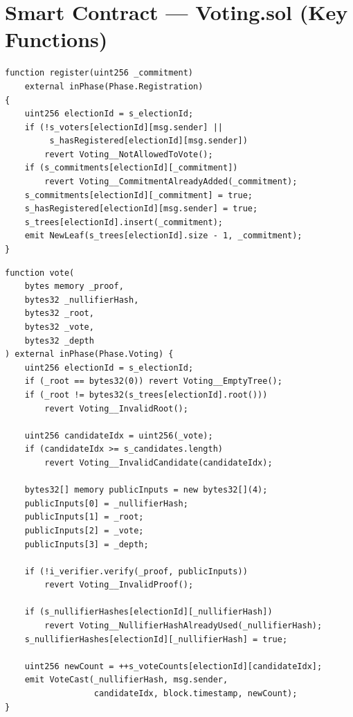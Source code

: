 \section{Smart Contract --- Voting.sol (Key Functions)}

\begin{lstlisting}[caption={Voting.sol --- Registration function}]
function register(uint256 _commitment)
    external inPhase(Phase.Registration)
{
    uint256 electionId = s_electionId;
    if (!s_voters[electionId][msg.sender] ||
         s_hasRegistered[electionId][msg.sender])
        revert Voting__NotAllowedToVote();
    if (s_commitments[electionId][_commitment])
        revert Voting__CommitmentAlreadyAdded(_commitment);
    s_commitments[electionId][_commitment] = true;
    s_hasRegistered[electionId][msg.sender] = true;
    s_trees[electionId].insert(_commitment);
    emit NewLeaf(s_trees[electionId].size - 1, _commitment);
}
\end{lstlisting}

\begin{lstlisting}[caption={Voting.sol --- Vote function with ZK verification}]
function vote(
    bytes memory _proof,
    bytes32 _nullifierHash,
    bytes32 _root,
    bytes32 _vote,
    bytes32 _depth
) external inPhase(Phase.Voting) {
    uint256 electionId = s_electionId;
    if (_root == bytes32(0)) revert Voting__EmptyTree();
    if (_root != bytes32(s_trees[electionId].root()))
        revert Voting__InvalidRoot();

    uint256 candidateIdx = uint256(_vote);
    if (candidateIdx >= s_candidates.length)
        revert Voting__InvalidCandidate(candidateIdx);

    bytes32[] memory publicInputs = new bytes32[](4);
    publicInputs[0] = _nullifierHash;
    publicInputs[1] = _root;
    publicInputs[2] = _vote;
    publicInputs[3] = _depth;

    if (!i_verifier.verify(_proof, publicInputs))
        revert Voting__InvalidProof();

    if (s_nullifierHashes[electionId][_nullifierHash])
        revert Voting__NullifierHashAlreadyUsed(_nullifierHash);
    s_nullifierHashes[electionId][_nullifierHash] = true;

    uint256 newCount = ++s_voteCounts[electionId][candidateIdx];
    emit VoteCast(_nullifierHash, msg.sender,
                  candidateIdx, block.timestamp, newCount);
}
\end{lstlisting}

